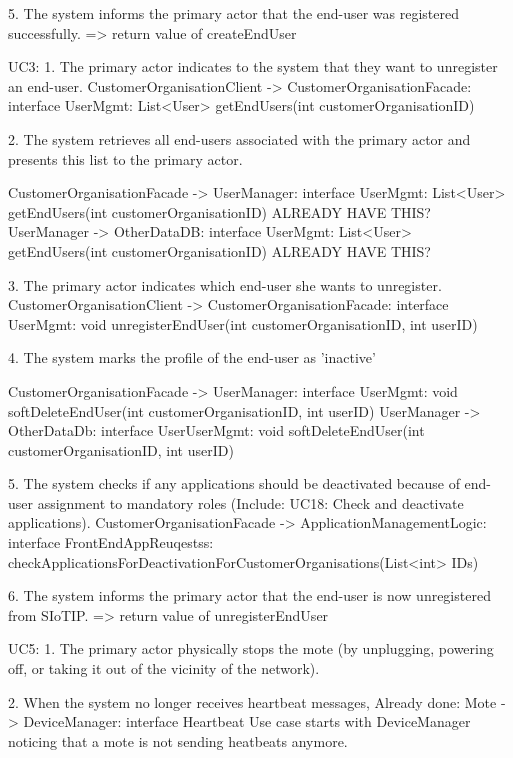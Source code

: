         5. The system informs the primary actor that the end-user was registered successfully.
            => return value of createEndUser


    UC3:
        1. The primary actor indicates to the system that they want to unregister an end-user.
            CustomerOrganisationClient -> CustomerOrganisationFacade: interface UserMgmt: List<User> getEndUsers(int customerOrganisationID)

        2. The system retrieves all end-users associated with the primary actor and presents this list to the primary actor.

            CustomerOrganisationFacade -> UserManager: interface UserMgmt: List<User> getEndUsers(int customerOrganisationID) ALREADY HAVE THIS?
            UserManager -> OtherDataDB: interface UserMgmt: List<User> getEndUsers(int customerOrganisationID) ALREADY HAVE THIS?

        3. The primary actor indicates which end-user she wants to unregister.
            CustomerOrganisationClient -> CustomerOrganisationFacade: interface UserMgmt: void unregisterEndUser(int customerOrganisationID, int userID)

        4. The system marks the profile of the end-user as 'inactive'

            CustomerOrganisationFacade -> UserManager: interface UserMgmt: void softDeleteEndUser(int customerOrganisationID, int userID)
            UserManager -> OtherDataDb: interface UserUserMgmt: void softDeleteEndUser(int customerOrganisationID, int userID)

        5. The system checks if any applications should be deactivated because of end-user assignment to mandatory roles (Include: UC18: Check and deactivate applications).
            CustomerOrganisationFacade -> ApplicationManagementLogic: interface FrontEndAppReuqestss: checkApplicationsForDeactivationForCustomerOrganisations(List<int> IDs)

        6. The system informs the primary actor that the end-user is now unregistered from SIoTIP.
            => return value of unregisterEndUser


    UC5:
        1. The primary actor physically stops the mote (by unplugging, powering off, or taking it out of the vicinity of the network).

        2. When the system no longer receives heartbeat messages,
            Already done: Mote -> DeviceManager: interface Heartbeat
            Use case starts with DeviceManager noticing that a mote is not sending heatbeats anymore.

